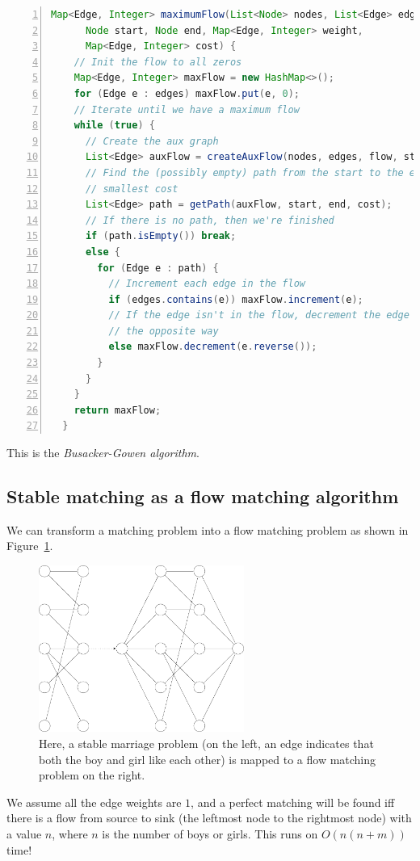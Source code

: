 \begin{lstlisting}[numbers=left,language=Java]
  Map<Edge, Integer> maximumFlow(List<Node> nodes, List<Edge> edges,
      Node start, Node end, Map<Edge, Integer> weight,
      Map<Edge, Integer> cost) {
    // Init the flow to all zeros
    Map<Edge, Integer> maxFlow = new HashMap<>();
    for (Edge e : edges) maxFlow.put(e, 0);
    // Iterate until we have a maximum flow
    while (true) {
      // Create the aux graph
      List<Edge> auxFlow = createAuxFlow(nodes, edges, flow, start, end);
      // Find the (possibly empty) path from the start to the end that has the
      // smallest cost
      List<Edge> path = getPath(auxFlow, start, end, cost);
      // If there is no path, then we're finished
      if (path.isEmpty()) break;
      else {
        for (Edge e : path) {
          // Increment each edge in the flow
          if (edges.contains(e)) maxFlow.increment(e);
          // If the edge isn't in the flow, decrement the edge going
          // the opposite way
          else maxFlow.decrement(e.reverse());
        }
      }
    }
    return maxFlow;
  }
\end{lstlisting}

This is the \textit{Busacker-Gowen algorithm}.

\subsection{Stable matching as a flow matching algorithm}

We can transform a matching problem into a flow matching problem as shown in
Figure~\ref{fig:matching-flow}.

\begin{figure}[H]
  \centering
  \includegraphics[width=0.6\textwidth]{diagrams/matching-flow}
  \caption{Here, a stable marriage problem (on the left, an edge indicates that
    both the boy and girl like each other) is mapped to a flow matching problem
    on the right.}
  \label{fig:matching-flow}
\end{figure}

We assume all the edge weights are $1$, and a perfect matching will be found iff
there is a flow from source to sink (the leftmost node to the rightmost node)
with a value $n$, where $n$ is the number of boys or girls. This runs on
$O(n(n+m))$ time!
